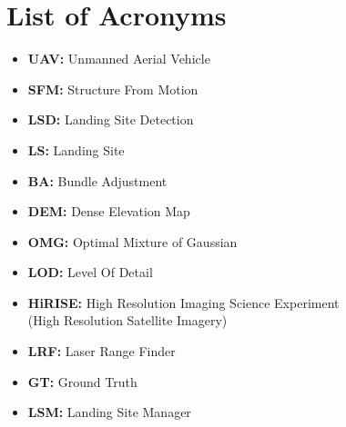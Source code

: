 \chapter*{List of Acronyms}

\begin{itemize}
    \item \textbf{UAV: } Unmanned Aerial Vehicle
    \item \textbf{SFM: } Structure From Motion
    \item \textbf{LSD: } Landing Site Detection
    \item \textbf{LS: } Landing Site 
    \item \textbf{BA: } Bundle Adjustment
    \item \textbf{DEM: } Dense Elevation Map
    \item \textbf{OMG: } Optimal Mixture of Gaussian
    \item \textbf{LOD: } Level Of Detail
    \item \textbf{HiRISE: } High Resolution Imaging Science Experiment \\(High Resolution Satellite Imagery)
    \item \textbf{LRF: } Laser Range Finder
    \item \textbf{GT: } Ground Truth
    \item \textbf{LSM: } Landing Site Manager
\end{itemize}